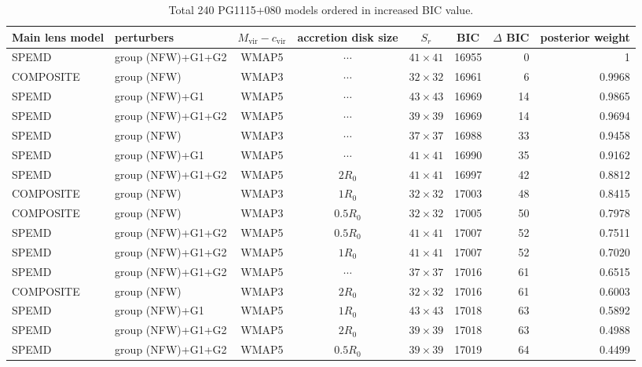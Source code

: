 \documentclass[useAMS,usenatbib]{mnras}
\def\nomicro{$\cdots$}
\begin{document}
\begin{table}
    \centering
    \caption{Total 240 PG1115+080 models ordered in increased BIC value.}
    \label{tab:6TD}
    \begin{tabular}{llccccrr}
        \hline
        Main lens model & perturbers &$M_{\textrm{vir}}-c_{\textrm{vir}}$& accretion disk size & $S_{r}$ & BIC & $\Delta$ BIC & posterior weight\\
        \hline
        SPEMD     & group (NFW)+G1+G2 &WMAP5 & \nomicro   &$41\times41$ & 16955 & 0  & 1\\ 
        COMPOSITE & group (NFW)       &WMAP3 & \nomicro   &$32\times32$ & 16961 & 6 & 0.9968\\
        SPEMD     & group (NFW)+G1    &WMAP5 & \nomicro   &$43\times43$ & 16969 & 14 & 0.9865\\ 
        SPEMD     & group (NFW)+G1+G2 &WMAP5 & \nomicro   &$39\times39$ & 16969 & 14 & 0.9694\\ 
        SPEMD     & group (NFW)       &WMAP3 & \nomicro   &$37\times37$ & 16988 & 33 & 0.9458\\ 
        SPEMD     & group (NFW)+G1    &WMAP5 & \nomicro   &$41\times41$ & 16990 & 35 & 0.9162\\ 
        SPEMD     & group (NFW)+G1+G2 &WMAP5 & $2R_{0}$   &$41\times41$ & 16997 & 42  & 0.8812\\ 
        COMPOSITE & group (NFW)       &WMAP3 & $1R_{0}$   &$32\times32$ & 17003 & 48 & 0.8415\\
        COMPOSITE & group (NFW)       &WMAP3 & $0.5R_{0}$ &$32\times32$ & 17005 & 50 & 0.7978\\
        SPEMD     & group (NFW)+G1+G2 &WMAP5 & $0.5R_{0}$ &$41\times41$ & 17007 & 52  & 0.7511\\ 
        SPEMD     & group (NFW)+G1+G2 &WMAP5 & $1R_{0}$   &$41\times41$ & 17007 & 52  & 0.7020\\
        SPEMD     & group (NFW)+G1+G2 &WMAP5 & \nomicro   &$37\times37$ & 17016 & 61 & 0.6515\\
        COMPOSITE & group (NFW)       &WMAP3 & $2R_{0}$   &$32\times32$ & 17016 & 61 & 0.6003\\
        SPEMD     & group (NFW)+G1    &WMAP5 & $1R_{0}$   &$43\times43$ & 17018 & 63 & 0.5892\\ 
        SPEMD     & group (NFW)+G1+G2 &WMAP5 & $2R_{0}$   &$39\times39$ & 17018 & 63 & 0.4988\\
        SPEMD     & group (NFW)+G1+G2 &WMAP5 & $0.5R_{0}$ &$39\times39$ & 17019 & 64 & 0.4499\\

\end{tabular}
\end{table}
\end{document}
